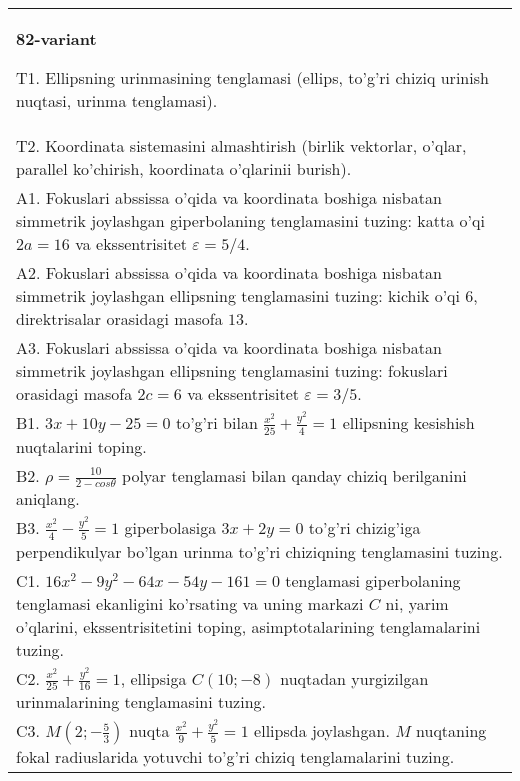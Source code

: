 \documentclass{article}
\begin{document}
\begin{tabular}{m{17cm}}
\textbf{82-variant}
\newline

T1. Ellipsning urinmasining tenglamasi (ellips, to'g'ri chiziq urinish nuqtasi, urinma tenglamasi).\\

T2. Koordinata sistemasini almashtirish (birlik vektorlar, o'qlar, parallel ko'chirish, koordinata o'qlarinii burish).\\

A1. Fokuslari abssissa o'qida va koordinata boshiga nisbatan simmetrik joylashgan giperbolaning tenglamasini tuzing: katta o'qi $2a=16$ va ekssentrisitet $\varepsilon=5/4$.\\

A2. Fokuslari abssissa o'qida va koordinata boshiga nisbatan simmetrik joylashgan ellipsning tenglamasini tuzing: kichik o'qi $6$, direktrisalar orasidagi masofa $13$.\\

A3. Fokuslari abssissa o'qida va koordinata boshiga nisbatan simmetrik joylashgan ellipsning tenglamasini tuzing: fokuslari orasidagi masofa $2c=6$ va ekssentrisitet $\varepsilon=3/5$.\\

B1. $3x + 10y - 25 = 0$ to'g'ri bilan $\frac{x^{2}}{25} + \frac{y^{2}}{4} = 1$ ellipsning kesishish nuqtalarini toping.  \\

B2. $\rho = \frac{10}{2 - cos\theta}$ polyar tenglamasi bilan qanday chiziq berilganini aniqlang.  \\

B3. $\frac{x^{2}}{4} - \frac{y^{2}}{5} = 1$ giperbolasiga $3x + 2y = 0$ to'g'ri chizig'iga perpendikulyar bo'lgan urinma to'g'ri chiziqning tenglamasini tuzing.\\

C1. $16x^{2} - 9y^{2} - 64x - 54y - 161 = 0$ tenglamasi giperbolaning tenglamasi ekanligini ko'rsating va uning markazi $C$ ni, yarim o'qlarini, ekssentrisitetini toping, asimptotalarining tenglamalarini tuzing.  \\

C2. $\frac{x^{2}}{25} + \frac{y^{2}}{16} = 1$, ellipsiga $C(10; - 8)$ nuqtadan yurgizilgan urinmalarining tenglamasini tuzing.  \\

C3. $M(2; - \frac{5}{3})$ nuqta $\frac{x^{2}}{9} + \frac{y^{2}}{5} = 1$ ellipsda joylashgan. $M$ nuqtaning fokal radiuslarida yotuvchi to'g'ri chiziq tenglamalarini tuzing.  \\

\end{tabular}
\vspace{1cm}
\end{document}
